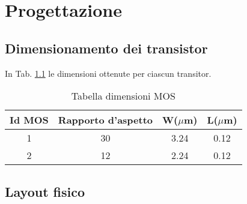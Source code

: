 
\chapter{Progettazione} %
\label{Chapter3} 

\section{Dimensionamento dei transistor}
\label{sec:dimensionamento}

In Tab. \ref{tab:dimensioniMos} le dimensioni ottenute per ciascun transitor.

\begin{table}[htb]
	\centering
	\begin{tabular}{c*{3}{c}}
		\toprule
		Id MOS & Rapporto d'aspetto & W($\mu$m) & L($\mu$m)\\
		\midrule
		1 & 30 & 3.24 & 0.12\\
		2 & 12 & 2.24 & 0.12\\
		\bottomrule
	\end{tabular}
	\caption{Tabella dimensioni MOS}
	\label{tab:dimensioniMos}
\end{table}

\section{Layout fisico}
\label{sec:layout}






